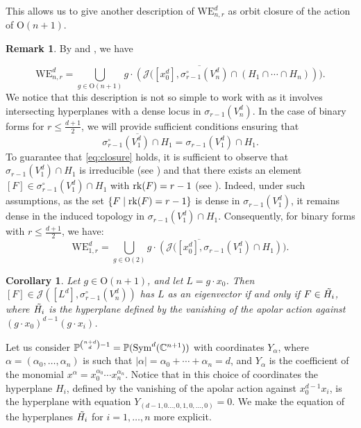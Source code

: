 \documentclass{amsart}
\numberwithin{theorem}{section}
\newtheorem{corollary}[theorem]{Corollary}
\theoremstyle{definition}
\newtheorem{remark}[theorem]{Remark}
\newcommand{\PP}{\mathbb{P}}
\newcommand{\CC}{\mathbb{C}}
\newcommand{\rk}{\mathop{\rm rk}\nolimits}
\newcommand{\sym}{\mathop{\rm Sym}\nolimits}
\begin{document}
This allows us to give another description of $\mathrm{WE}_{n,r}^d$ as orbit closure of the action of $\mathrm{O}(n+1)$.

\begin{remark}\label{rmk: orbitclosure}
By  and , we have

$$\mathrm{WE}_{n,r}^d=\overline{\bigcup_{g\in \mathrm{O}(n+1)} g\cdot\left( \mathcal{J}( [x_0^d],\sigma_{r-1}^\circ(V^d_n)\cap (H_1\cap \cdots \cap H_n)\right))}.$$
We notice that this description is not so simple to work with as it involves intersecting hyperplanes with a dense locus in $\sigma_{r-1}(V_n^d)$. In the case of binary forms for $r \leq \frac{d+1}{2}$, we will provide sufficient conditions ensuring that
\begin{equation}\label{eq:closure}
\overline{\sigma_{r-1}^\circ(V_1^d)\cap H_1}=\sigma_{r-1}(V_1^d)\cap H_1.\end{equation}
To guarantee that \cref{eq:closure} holds, it is sufficient to observe that $\sigma_{r-1}(V_1^d)\cap H_1$ is irreducible (see ) and that there exists an element $[F]\in \sigma_{r-1}^\circ(V_1^d)\cap H_1$ with $\rk(F)=r-1$ (see ). Indeed, under such assumptions, as the set $\{F\mid \rk (F)=r-1\}$ is dense in $\sigma_{r-1}(V_1^d)$, it remains dense in the induced topology in $\sigma_{r-1}(V_1^d)\cap H_1$. Consequently, for binary forms with $r \leq \frac{d+1}{2}$, we have: 
\begin{equation}\label{eq: WE orbita intersezione chiuso}
\mathrm{WE}_{1,r}^d=\overline{\bigcup_{g\in \mathrm{O}(2)} g\cdot\left( \mathcal{J}( [x_0^d],\sigma_{r-1}(V^d_1)\cap H_1\right))}.
\end{equation}

\end{remark}



\begin{corollary}\label{cor:equations2}
    Let $g\in \mathrm O(n+1)$, and let $L=g\cdot x_0$. Then $[F]\in \mathcal J([L^d],\sigma_{r-1}^\circ(V_n^d))$ has $L$ as an eigenvector if and only if $F\in{\Tilde{H_i}}$, where $\Tilde{H_i}$ is the hyperplane defined by the vanishing of the apolar action against $(g\cdot x_0)^{d-1}(g\cdot x_i)$.
\end{corollary}

Let us consider $\PP^{\binom{n+d}{d}-1}=\PP(\sym^{d}(\CC^{n+1}))$ with coordinates $Y_{\alpha}$, where $\alpha=(\alpha_0,\dots,\alpha_n)$ is such that $|\alpha|=\alpha_0+\cdots+\alpha_n=d $, and $Y_\alpha$ is the coefficient of the monomial $x^\alpha=x_0^{\alpha_0}\cdots x_n^{\alpha_n}$. 
Notice that in this choice of coordinates the hyperplane $H_i$, defined by the vanishing of the apolar action against $x_0^{d-1}x_i$, is the hyperplane with equation $Y_{(d-1,0\dots,0,1,0,\dots,0)}=0$. We make the equation of the hyperplanes $\Tilde{H_i}$ for $i=1,\dots,n$ more explicit. 
\end{document}
